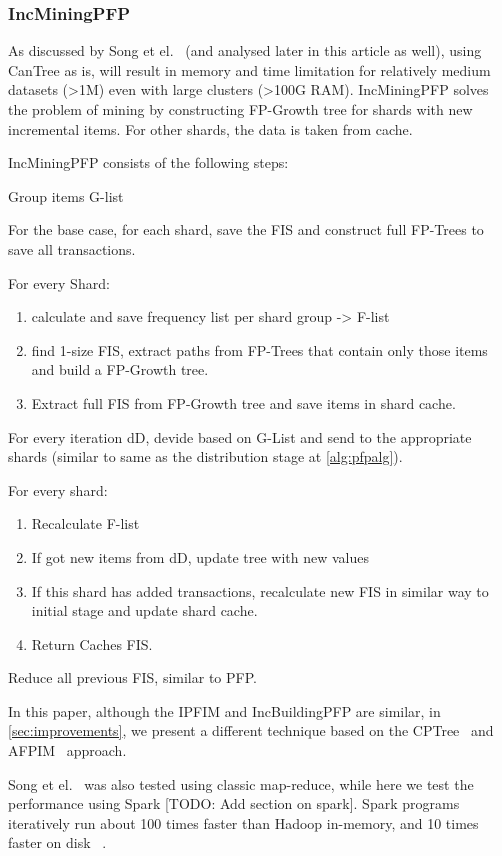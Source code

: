 \subsubsection{IncMiningPFP}
As discussed by Song et el.~\cite{song2017} (and analysed later in this article as well), using CanTree as is, will result in memory and time limitation for relatively medium datasets (>1M) even with large clusters (>100G RAM).  IncMiningPFP solves the problem of mining by constructing FP-Growth tree for shards with new incremental items. For other shards, the data is taken from cache.

IncMiningPFP consists of the following steps:
\begin{steps}
	\item Group items G-list
	\item For the base case, for each shard, save the FIS and construct full FP-Trees to save all transactions. 
	\item For every Shard:
			\begin{enumerate}
			\item calculate and save frequency list per shard group -> F-list
			\item find 1-size FIS, extract paths from FP-Trees that contain only those items and build a FP-Growth tree.
			\item Extract full FIS from FP-Growth tree and save items in shard cache.
			\end{enumerate}
	\item For every iteration dD, devide based on G-List and send to the appropriate shards (similar to same as the distribution  stage at \autoref{alg:pfpalg}).
	\item For every shard: 
				\begin{enumerate}
				\item Recalculate F-list
				\item If got new items from dD, update tree with new values
				\item If this shard has added transactions, recalculate new FIS in similar way to initial stage and update shard cache. 
				\item Return Caches FIS.
				\end{enumerate}
	\item Reduce all previous FIS, similar to PFP.
\end{steps}

In this paper, although the IPFIM and IncBuildingPFP are similar, in \autoref{sec:improvements}, we present a different technique based on the CPTree~\cite{tanbeer2009efficient} and AFPIM~\cite{koh2004efficient} approach.

Song et el.~\cite{song2017} was also tested using classic map-reduce, while here we test the performance using Spark [TODO: Add section on spark]. Spark programs iteratively run about 100 times faster than Hadoop in-memory, and 10 times faster on disk ~\cite{spark}.
